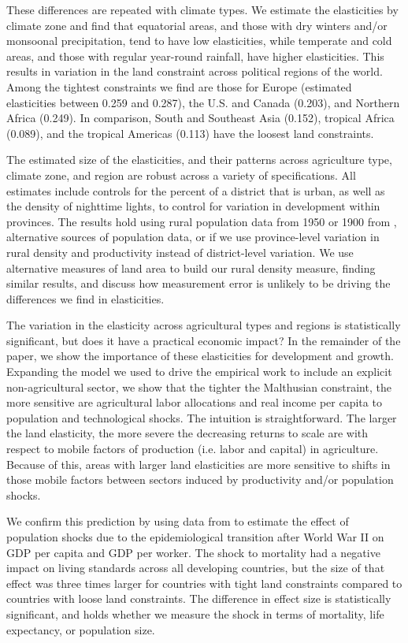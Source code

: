 \documentclass[11pt]{article}
\begin{document}
These differences are repeated with climate types. We estimate the elasticities by climate zone and find that equatorial areas, and those with dry winters and/or monsoonal precipitation, tend to have low elasticities, while temperate and cold areas, and those with regular year-round rainfall, have higher elasticities. This results in variation in the land constraint across political regions of the world. Among the tightest constraints we find are those for Europe (estimated elasticities between 0.259 and 0.287), the U.S. and Canada (0.203), and Northern Africa (0.249). In comparison, South and Southeast Asia (0.152), tropical Africa (0.089), and the tropical Americas (0.113) have the loosest land constraints. 

The estimated size of the elasticities, and their patterns across agriculture type, climate zone, and region are robust across a variety of specifications. All estimates include controls for the percent of a district that is urban, as well as the density of nighttime lights, to control for variation in development within provinces. The results hold using rural population data from 1950 or 1900 from \cite{hyde31}, alternative sources of population data, or if we use province-level variation in rural density and productivity instead of district-level variation. We use alternative measures of land area to build our rural density measure, finding similar results, and discuss how measurement error is unlikely to be driving the differences we find in elasticities.

The variation in the elasticity across agricultural types and regions is statistically significant, but does it have a practical economic impact? In the remainder of the paper, we show the importance of these elasticities for development and growth. Expanding the model we used to drive the empirical work to include an explicit non-agricultural sector, we show that the tighter the Malthusian constraint, the more sensitive are agricultural labor allocations and real income per capita to population and technological shocks. The intuition is straightforward. The larger the land elasticity, the more severe the decreasing returns to scale are with respect to mobile factors of production (i.e. labor and capital) in agriculture. Because of this, areas with larger land elasticities are more sensitive to shifts in those mobile factors between sectors induced by productivity and/or population shocks.

We confirm this prediction by using data from \cite{aj07} to estimate the effect of population shocks due to the epidemiological transition after World War II on GDP per capita and GDP per worker. The shock to mortality had a negative impact on living standards across all developing countries, but the size of that effect was three times larger for countries with tight land constraints compared to countries with loose land constraints. The difference in effect size is statistically significant, and holds whether we measure the shock in terms of mortality, life expectancy, or population size.
\end{document}
